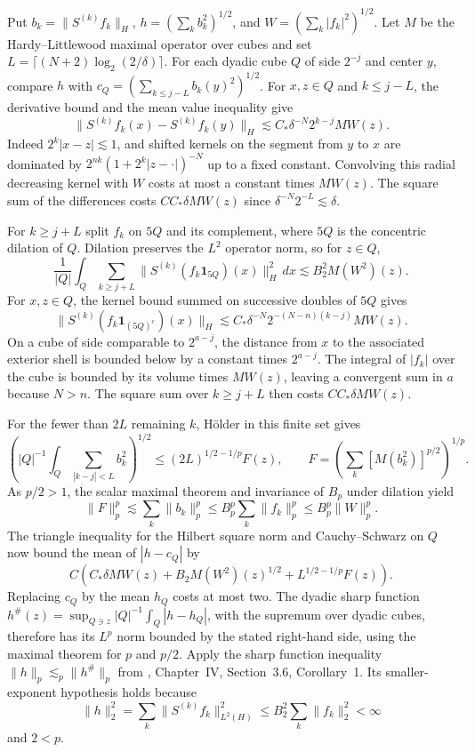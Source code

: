 Put $b_k=\|S^{(k)}f_k\|_H$, $h=(\sum_k b_k^2)^{1/2}$, and $W=(\sum_k |f_k|^2)^{1/2}$. Let $M$ be the Hardy--Littlewood maximal operator over cubes and set $L=\lceil(N+2)\log_2(2/\delta)\rceil$. For each dyadic cube $Q$ of side $2^{-j}$ and center $y$, compare $h$ with $c_Q=(\sum_{k\le j-L} b_k(y)^2)^{1/2}$. For $x,z\in Q$ and $k\le j-L$, the derivative bound and the mean value inequality give
\[
 \|S^{(k)}f_k(x)-S^{(k)}f_k(y)\|_H
 \lesssim C_*\delta^{-N}2^{k-j}MW(z).
\]
Indeed $2^k|x-z|\lesssim1$, and shifted kernels on the segment from $y$ to $x$ are dominated by $2^{nk}(1+2^k|z-\cdot|)^{-N}$ up to a fixed constant. Convolving this radial decreasing kernel with $W$ costs at most a constant times $MW(z)$. The square sum of the differences costs $CC_*\delta MW(z)$ since $\delta^{-N}2^{-L}\lesssim\delta$.

For $k\ge j+L$ split $f_k$ on $5Q$ and its complement, where $5Q$ is the concentric dilation of $Q$. Dilation preserves the $L^2$ operator norm, so for $z\in Q$,
\[
 \frac1{|Q|}\int_Q\sum_{k\ge j+L}
 \|S^{(k)}(f_k\mathbf1_{5Q})(x)\|_H^2\,dx
 \lesssim B_2^2 M(W^2)(z).
\]
For $x,z\in Q$, the kernel bound summed on successive doubles of $5Q$ gives
\[
 \|S^{(k)}(f_k\mathbf1_{(5Q)^c})(x)\|_H
 \lesssim C_*\delta^{-N}2^{-(N-n)(k-j)} MW(z).
\]
On a cube of side comparable to $2^{a-j}$, the distance from $x$ to the associated exterior shell is bounded below by a constant times $2^{a-j}$. The integral of $|f_k|$ over the cube is bounded by its volume times $MW(z)$, leaving a convergent sum in $a$ because $N>n$. The square sum over $k\ge j+L$ then costs $CC_*\delta MW(z)$.

For the fewer than $2L$ remaining $k$, H\"older in this finite set gives
\[
 \left(|Q|^{-1}\int_Q\sum_{|k-j|<L}b_k^2\right)^{1/2}
 \le(2L)^{1/2-1/p}F(z),\qquad
 F=\left(\sum_k[M(b_k^2)]^{p/2}\right)^{1/p}.
\]
As $p/2>1$, the scalar maximal theorem and invariance of $B_p$ under dilation yield
\[
 \|F\|_p^p\lesssim\sum_k\|b_k\|_p^p
 \le B_p^p\sum_k\|f_k\|_p^p\le B_p^p\|W\|_p^p.
\]
The triangle inequality for the Hilbert square norm and Cauchy--Schwarz on $Q$ now bound the mean of $|h-c_Q|$ by
\[
 C\left(C_*\delta MW(z)+B_2M(W^2)(z)^{1/2}
       +L^{1/2-1/p}F(z)\right).
\]
Replacing $c_Q$ by the mean $h_Q$ costs at most two. The dyadic sharp function $h^\#(z)=\sup_{Q\ni z}|Q|^{-1}\int_Q|h-h_Q|$, with the supremum over dyadic cubes, therefore has its $L^p$ norm bounded by the stated right-hand side, using the maximal theorem for $p$ and $p/2$. Apply the sharp function inequality $\|h\|_p\lesssim_p\|h^\#\|_p$ from \cite{r-74}, Chapter~IV, Section~3.6, Corollary~1. Its smaller-exponent hypothesis holds because
\[
 \|h\|_2^2=\sum_k\|S^{(k)}f_k\|_{L^2(H)}^2
 \le B_2^2\sum_k\|f_k\|_2^2<\infty
\]
and $2<p$.
